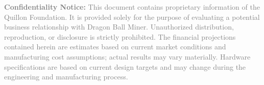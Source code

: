 \documentclass[11pt,a4paper]{article}
\begin{document}
\vspace{0.5cm}

\begin{center}
\begin{minipage}{13cm}
{\scriptsize\textcolor{gray}{
\textbf{Confidentiality Notice:} This document contains proprietary information of the Quillon Foundation. It is provided solely for the purpose of evaluating a potential business relationship with Dragon Ball Miner. Unauthorized distribution, reproduction, or disclosure is strictly prohibited. The financial projections contained herein are estimates based on current market conditions and manufacturing cost assumptions; actual results may vary materially. Hardware specifications are based on current design targets and may change during the engineering and manufacturing process.
}}
\end{minipage}
\end{center}
\end{document}
